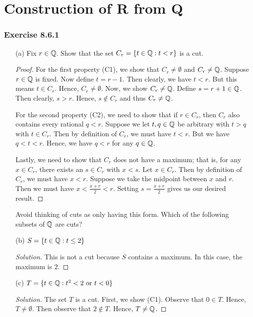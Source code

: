 \section{Construction of R from Q}

\subsubsection{Exercise 8.6.1} 
\begin{enumerate}
    \item[(a)] Fix \( r \in \mathbb{Q}  \). Show that the set \( C_{r} = \{ t \in \mathbb{Q} : t < r  \}  \) is a cut.
        \begin{proof}
        For the first property (C1), we show that \( C_{r} \neq \emptyset  \) and \( C_{r} \neq \mathbb{Q}  \). Suppose \( r \in \mathbb{Q}  \) is fixed. Now define \( t = r - 1  \). Then clearly, we have \( t  <r  \). But this means \( t \in C_{r } \). Hence, \(  C_{r} \neq \emptyset \). Now, we show \( C_{r} \neq \mathbb{Q}  \). Define \( s = r + 1 \in \mathbb{Q}   \). Then clearly, \( s > r  \). Hence, \( s \notin C_{r} \) and thus \( C_{r} \neq \mathbb{Q}  \).

        For the second property (C2), we need to show that if \( r \in C_{r} \), then \( C_{r}  \) also contains every rational \( q < r  \). Suppose we let \( t,q  \in \mathbb{Q}  \) be arbitrary with \( t > q  \) with \( t \in C_{r} \). Then by definition of \( C_{r} \), we must have \( t < r  \). But we have \( q < t < r  \). Hence, we have \( q < r  \) for any \( q \in \mathbb{Q}  \). 

        Lastly, we need to show that \( C_{r}  \) does not have a maximum; that is, for any \( x \in C_{r}  \), there exists an \( s \in C_{r}  \) with \( x < s  \). Let \( x \in C_{r}  \). Then by definition of \( C_{r}  \), we must have \( x < r  \). Suppose we take the midpoint between \( x \) and \( r  \). Then we must have \( x < \frac{ x  +r  }{ 2  } < r  \). Setting \( s = \frac{ x +r  }{ 2  }  \) gives us our desired result.
        \end{proof}
        Avoid thinking of cuts as only having this form. Which of the following subsets of \( \mathbb{Q}  \) are cuts?
    \item[(b)] \( S = \{ t \in \mathbb{Q} : t \leq 2  \}  \)
        \begin{proof}[Solution]
        This is not a cut because \( S  \) contains a maximum. In this case, the maximum is \( 2  \).
        \end{proof}
    \item[(c)] \( T = \{ t \in \mathbb{Q} : t^{2} < 2 \ \text{or} \ t < 0  \}  \)
        \begin{proof}[Solution]
        The set \( T  \) is a cut. First, we show (C1). Observe that \(  0 \in T  \). Hence, \( T \neq \emptyset \). Then observe that \(  2 \notin T  \). Hence, \(  T \neq \mathbb{Q}  \). 


\end{proof}
\end{enumerate}
